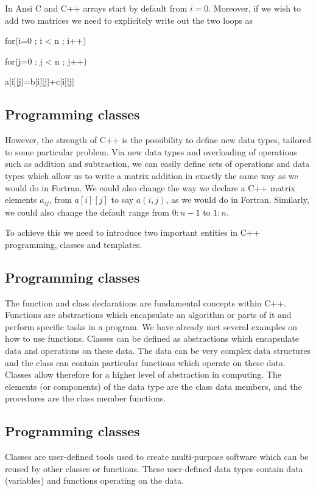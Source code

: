 \documentclass[%
oneside,                 %
final,                   %
10pt]{article}
\begin{document}
{{{{{In Ansi C and C++ arrays start by default from $i=0$.  Moreover, if we  wish to add two matrices we need to explicitely write out
the two loops as

\bcppcod
   for(i=0 ; i < n ; i++) {
      for(j=0 ; j < n ; j++) {
         a[i][j]=b[i][j]+c[i][j]

\ecppcod

\subsection{Programming classes}

However,
the strength of C++ is the possibility
to define new data types, tailored to some particular problem.
Via new data types and overloading of operations such as addition and subtraction, we can easily define
sets of operations and data types which allow us to write a matrix addition in exactly the same
way as we would do in Fortran.  We could also change the way we declare a C++ matrix elements $a_{ij}$, from  $a[i][j]$
to say $a(i,j)$, as we would do in Fortran. Similarly, we could also change the default range from $0:n-1$ to $1:n$.

To achieve this we need to introduce two important entities in C++ programming, classes and templates.

\subsection{Programming classes}

The function and class declarations are fundamental concepts within C++.  Functions are abstractions
which encapsulate an algorithm or parts of it and perform specific tasks in a program.
We have already met several examples on how to use  functions.
Classes can be defined as abstractions which encapsulate
data and operations on these data.
The data can be very complex data structures  and the class can contain particular functions
which operate on these data. Classes allow therefore for a higher level of abstraction in computing.
The elements (or components) of the data
type are the class data members, and the procedures are the class
member functions.

\subsection{Programming classes}

Classes are user-defined tools used to create multi-purpose software which can be reused by other classes or functions.
These user-defined data types contain data (variables) and
functions operating on the data.

}}}}}}}
\end{document}
